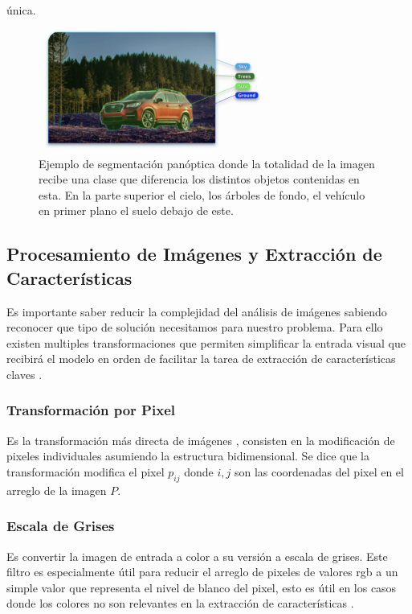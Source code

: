\documentclass[letter,12pt]{report}
\begin{document}
\begin{itemize}
        única.
        \begin{figure}[H]
            \centering
            \includegraphics[width=0.7\textwidth]{segment}
            \caption{Ejemplo de segmentación panóptica donde la totalidad de la imagen
            recibe una clase que diferencia los distintos objetos contenidas en esta. En
            la parte superior el cielo, los árboles de fondo, el vehículo en primer plano el
            suelo debajo de este.}
            \label{fig:segment}
        \end{figure} 
\end{itemize}

\subsection{Procesamiento de Imágenes y Extracción de Características}
Es importante saber reducir la complejidad del análisis de imágenes sabiendo reconocer
que tipo de solución necesitamos para nuestro problema. Para ello existen multiples
transformaciones que permiten simplificar la entrada visual que recibirá el modelo en
orden de facilitar la tarea de extracción de características claves \cite{Prince}.

\subsubsection{Transformación por Pixel}
Es la transformación más directa de imágenes \cite{Pixel}, consisten en la modificación de
pixeles individuales asumiendo la estructura bidimensional. Se dice que la transformación
modifica el pixel $p_{ij}$ donde $i, j$ son las coordenadas del pixel en el arreglo de la
imagen $P$.

\subsubsection{Escala de Grises}
Es convertir la imagen de entrada a color a su versión a escala de grises. Este filtro es
especialmente útil para reducir el arreglo de pixeles de valores rgb a un simple valor
que representa el nivel de blanco del pixel, esto es útil en los casos donde los colores
no son relevantes en la extracción de características \cite{Pixel}.
\end{document}
